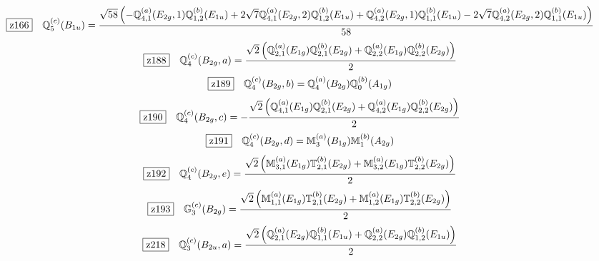 \documentclass[fleqn,10pt,landscape]{jsarticle}
\begin{document}
\begin{dmath*}
\hspace*{3mm}\fbox{z166}\quad \mathbb{Q}_{5}^{(c)}(B_{1u})=\frac{\sqrt{58} \left(- \mathbb{Q}_{4,1}^{(a)}(E_{2g},1) \mathbb{Q}_{1,2}^{(b)}(E_{1u}) + 2 \sqrt{7} \mathbb{Q}_{4,1}^{(a)}(E_{2g},2) \mathbb{Q}_{1,2}^{(b)}(E_{1u}) + \mathbb{Q}_{4,2}^{(a)}(E_{2g},1) \mathbb{Q}_{1,1}^{(b)}(E_{1u}) - 2 \sqrt{7} \mathbb{Q}_{4,2}^{(a)}(E_{2g},2) \mathbb{Q}_{1,1}^{(b)}(E_{1u})\right)}{58}
\end{dmath*}
\begin{dmath*}
\hspace*{3mm}\fbox{z188}\quad \mathbb{Q}_{4}^{(c)}(B_{2g},a)=\frac{\sqrt{2} \left(\mathbb{Q}_{2,1}^{(a)}(E_{1g}) \mathbb{Q}_{2,1}^{(b)}(E_{2g}) + \mathbb{Q}_{2,2}^{(a)}(E_{1g}) \mathbb{Q}_{2,2}^{(b)}(E_{2g})\right)}{2}
\end{dmath*}
\begin{dmath*}
\hspace*{3mm}\fbox{z189}\quad \mathbb{Q}_{4}^{(c)}(B_{2g},b)=\mathbb{Q}_{4}^{(a)}(B_{2g}) \mathbb{Q}_{0}^{(b)}(A_{1g})
\end{dmath*}
\begin{dmath*}
\hspace*{3mm}\fbox{z190}\quad \mathbb{Q}_{4}^{(c)}(B_{2g},c)=- \frac{\sqrt{2} \left(\mathbb{Q}_{4,1}^{(a)}(E_{1g}) \mathbb{Q}_{2,1}^{(b)}(E_{2g}) + \mathbb{Q}_{4,2}^{(a)}(E_{1g}) \mathbb{Q}_{2,2}^{(b)}(E_{2g})\right)}{2}
\end{dmath*}
\begin{dmath*}
\hspace*{3mm}\fbox{z191}\quad \mathbb{Q}_{4}^{(c)}(B_{2g},d)=\mathbb{M}_{3}^{(a)}(B_{1g}) \mathbb{M}_{1}^{(b)}(A_{2g})
\end{dmath*}
\begin{dmath*}
\hspace*{3mm}\fbox{z192}\quad \mathbb{Q}_{4}^{(c)}(B_{2g},e)=\frac{\sqrt{2} \left(\mathbb{M}_{3,1}^{(a)}(E_{1g}) \mathbb{T}_{2,1}^{(b)}(E_{2g}) + \mathbb{M}_{3,2}^{(a)}(E_{1g}) \mathbb{T}_{2,2}^{(b)}(E_{2g})\right)}{2}
\end{dmath*}
\begin{dmath*}
\hspace*{3mm}\fbox{z193}\quad \mathbb{G}_{3}^{(c)}(B_{2g})=\frac{\sqrt{2} \left(\mathbb{M}_{1,1}^{(a)}(E_{1g}) \mathbb{T}_{2,1}^{(b)}(E_{2g}) + \mathbb{M}_{1,2}^{(a)}(E_{1g}) \mathbb{T}_{2,2}^{(b)}(E_{2g})\right)}{2}
\end{dmath*}
\begin{dmath*}
\hspace*{3mm}\fbox{z218}\quad \mathbb{Q}_{3}^{(c)}(B_{2u},a)=\frac{\sqrt{2} \left(\mathbb{Q}_{2,1}^{(a)}(E_{2g}) \mathbb{Q}_{1,1}^{(b)}(E_{1u}) + \mathbb{Q}_{2,2}^{(a)}(E_{2g}) \mathbb{Q}_{1,2}^{(b)}(E_{1u})\right)}{2}
\end{dmath*}
\end{document}
